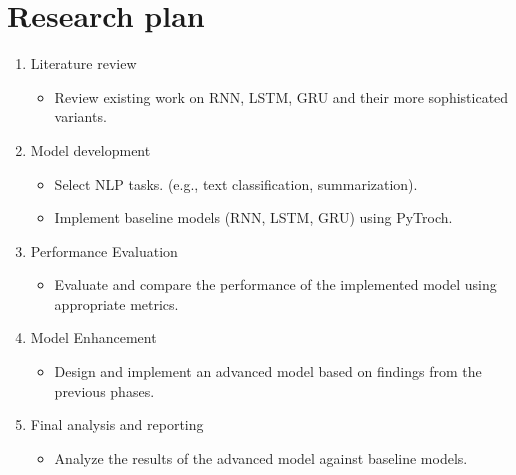 \documentclass[12pt,a4paper]{article}
\begin{document}
\section{Research plan}
\begin{enumerate}
    \item Literature review
    \begin{itemize}
        \item Review existing work on RNN, LSTM, GRU and their more sophisticated variants. 
    \end{itemize}

    \item Model development
    \begin{itemize}
        \item Select NLP tasks. (e.g., text classification, summarization).
        \item Implement baseline models (RNN, LSTM, GRU) using PyTroch.
    \end{itemize}

    \item Performance Evaluation
    \begin{itemize}
        \item Evaluate and compare the performance of the implemented model using appropriate metrics. 
    \end{itemize}

    \item Model Enhancement
    \begin{itemize}
        \item Design and implement an advanced model based on findings from the previous phases.
    \end{itemize}

    \item Final analysis and reporting
    \begin{itemize}
        \item Analyze the results of the advanced model against baseline models. 
    \end{itemize}
\end{enumerate}

\end{document}
